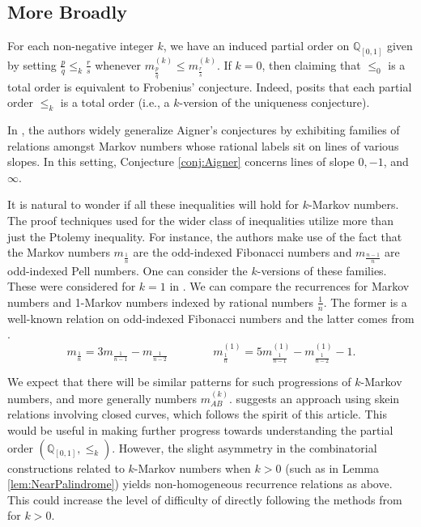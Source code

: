 \documentclass[12pt, letterpaper,table]{amsart}
\theoremstyle{remark}
\newcommand{\fpq}{\frac{p}{q}}
\newcommand{\frs}{\frac{r}{s}}
\begin{document}
\subsection{More Broadly}

For each non-negative integer $k$, we have an induced partial order on $\mathbb{Q}_{[0,1]}$ given by setting $\fpq \leq_k \frs$ whenever $m^{(k)}_\fpq \leq m^{(k)}_\frs$. If $k = 0$, then claiming that $\leq_0$ is a total order is equivalent to Frobenius' conjecture. Indeed, \cite[Conjecture 1.8]{gyoda2023uniqueness} posits that each partial order $\leq_k$ is a total order (i.e., a $k$-version of the uniqueness conjecture). 

In \cite{LLRS}, the authors widely generalize Aigner's conjectures by exhibiting families of relations amongst Markov numbers whose rational labels sit on lines of various slopes. In this setting, Conjecture \ref{conj:Aigner} concerns lines of slope $0,-1$, and $\infty$.

It is natural to wonder if all these inequalities will hold for $k$-Markov numbers. The proof techniques used for the wider class of inequalities utilize more than just the Ptolemy inequality. For instance, the authors make use of the fact that the Markov numbers $m_{\frac1n}$ are the odd-indexed Fibonacci numbers and $m_{\frac{n-1}{n}}$ are odd-indexed Pell numbers. One can consider the $k$-versions of these families. These were considered for $k = 1$ in \cite[Section 4]{banaian2024generalization}. We can compare the recurrences for Markov numbers and 1-Markov numbers indexed by rational numbers $\frac1n$. The former is a well-known relation on odd-indexed Fibonacci numbers and the latter comes from \cite[Proposition 2]{banaian2024generalization}. \[
m_{\frac1n} = 3m_{\frac{1}{n-1}} - m_{\frac{1}{n-2}} \qquad \qquad m_{\frac{1}{n}}^{(1)} = 5m^{(1)}_{\frac{1}{n-1}} - m^{(1)}_{\frac{1}{n-2}} - 1.
\]

We expect that there will be similar patterns for such progressions of $k$-Markov numbers, and more generally numbers $m_{AB}^{(k)}$. \cite[Remark 6.3]{LLRS} suggests an approach using skein relations involving closed curves, which follows the spirit of this article. This would be useful in making further progress towards understanding the partial order $(\mathbb{Q}_{[0,1]},\leq_k)$. However, the slight asymmetry in the combinatorial constructions related to $k$-Markov numbers when $k > 0$ (such as in Lemma \ref{lem:NearPalindrome}) yields non-homogeneous recurrence relations as above. This could increase the level of difficulty of directly following the methods from \cite{LLRS} for $k > 0$.
\end{document}
